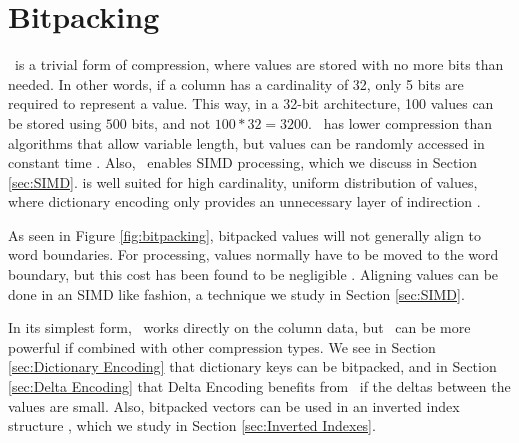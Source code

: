 \section{Bitpacking}
\label{sec:Bitpacking}

\bp~is a trivial form of compression, where values are stored with no more bits than needed. In other words, if a column has a cardinality of 32, only 5 bits are required to represent a value. This way, in a 32-bit architecture, 100 values can be stored using $500$ bits, and not $100*32 = 3200$. \bp~has lower compression than algorithms that allow variable length, but values can be randomly accessed in constant time \cite{Raman2008-gi, Willhalm2013-ri}. Also, \bp~enables SIMD processing, which we discuss in Section \ref{sec:SIMD}. \bp is well suited for high cardinality, uniform distribution of values, where dictionary encoding only provides an unnecessary layer of indirection \cite{Holloway2008-rr}.

As seen in Figure \ref{fig:bitpacking}, bitpacked values will not generally align to word boundaries. For processing, values normally have to be moved to the word boundary, but this cost has been found to be negligible \cite{Holloway2008-rr}. Aligning values can be done in an SIMD like fashion, a technique we study in Section \ref{sec:SIMD}.

In its simplest form, \bp~works directly on the column data, but \bp~can be more powerful if combined with other compression types. We see in Section \ref{sec:Dictionary Encoding} that dictionary keys can be bitpacked, and in Section \ref{sec:Delta Encoding} that Delta Encoding benefits from \bp~if the deltas between the values are small. Also, bitpacked vectors can be used in an inverted index structure \cite{Schwalb2014-hn}, which we study in Section \ref{sec:Inverted Indexes}.

